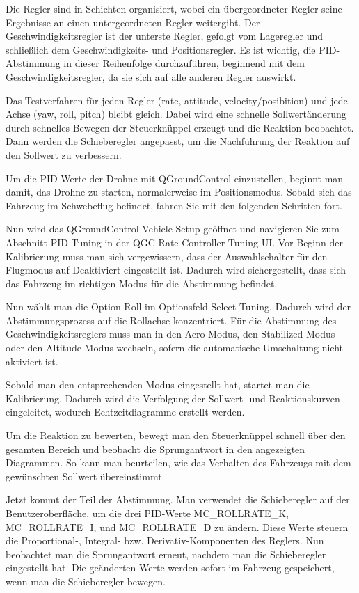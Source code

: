 Die Regler sind in Schichten organisiert, wobei ein übergeordneter Regler seine Ergebnisse an einen untergeordneten Regler weitergibt. Der Geschwindigkeitsregler ist der unterste Regler, gefolgt vom Lageregler und schließlich dem Geschwindigkeits- und Positionsregler. Es ist wichtig, die PID-Abstimmung in dieser Reihenfolge durchzuführen, beginnend mit dem Geschwindigkeitsregler, da sie sich auf alle anderen Regler auswirkt.

Das Testverfahren für jeden Regler (rate, attitude, velocity/posibition) und jede Achse (yaw, roll, pitch) bleibt gleich. Dabei wird eine schnelle Sollwertänderung durch schnelles Bewegen der Steuerknüppel erzeugt und die Reaktion beobachtet. Dann werden die Schieberegler angepasst, um die Nachführung der Reaktion auf den Sollwert zu verbessern.

Um die PID-Werte der Drohne mit QGroundControl einzustellen, beginnt man damit, das Drohne zu starten, normalerweise im Positionsmodus. Sobald sich das Fahrzeug im Schwebeflug befindet, fahren Sie mit den folgenden Schritten fort.

Nun wird  das QGroundControl Vehicle Setup geöffnet und navigieren Sie zum Abschnitt PID Tuning in der QGC Rate Controller Tuning UI. Vor Beginn der Kalibrierung muss man sich vergewissern, dass der Auswahlschalter für den Flugmodus auf Deaktiviert eingestellt ist. Dadurch wird sichergestellt, dass sich das Fahrzeug im richtigen Modus für die Abstimmung befindet.

Nun wählt man die Option Roll im Optionsfeld Select Tuning. Dadurch wird der Abstimmungsprozess auf die Rollachse konzentriert.
Für die Abstimmung des Geschwindigkeitsreglers muss man in den Acro-Modus, den Stabilized-Modus oder den Altitude-Modus wechseln, sofern die automatische Umschaltung nicht aktiviert ist.

Sobald man den entsprechenden Modus eingestellt hat, startet man die Kalibrierung. Dadurch wird die Verfolgung der Sollwert- und Reaktionskurven eingeleitet, wodurch Echtzeitdiagramme erstellt werden.

Um die Reaktion zu bewerten, bewegt man den Steuerknüppel schnell über den gesamten Bereich und beobacht die Sprungantwort in den angezeigten Diagrammen. So kann man beurteilen, wie das Verhalten des Fahrzeugs mit dem gewünschten Sollwert übereinstimmt.

Jetzt kommt der Teil der Abstimmung. Man verwendet die Schieberegler auf der Benutzeroberfläche, um die drei PID-Werte MC\_ROLLRATE\_K, MC\_ROLLRATE\_I, und MC\_ROLLRATE\_D zu ändern. Diese Werte steuern die Proportional-, Integral- bzw. Derivativ-Komponenten des Reglers. Nun beobachtet man die Sprungantwort erneut, nachdem man die Schieberegler eingestellt hat. Die geänderten Werte werden sofort im Fahrzeug gespeichert, wenn man die Schieberegler bewegen.

